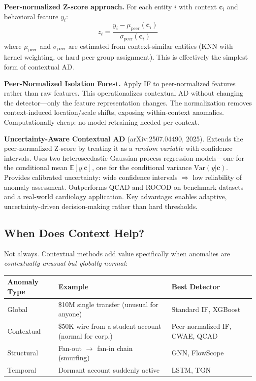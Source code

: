 \documentclass[11pt]{article}
\begin{document}
\textbf{Peer-normalized Z-score approach.} For each entity $i$ with context $\mathbf{c}_i$ and behavioral feature $y_i$:
\begin{equation*}
z_i = \frac{y_i - \mu_{\mathrm{peer}}(\mathbf{c}_i)}{\sigma_{\mathrm{peer}}(\mathbf{c}_i)}
\end{equation*}
where $\mu_{\mathrm{peer}}$ and $\sigma_{\mathrm{peer}}$ are estimated from context-similar entities (KNN with kernel weighting, or hard peer group assignment). This is effectively the simplest form of contextual AD.

\textbf{Peer-Normalized Isolation Forest.} Apply IF to peer-normalized features rather than raw features. This operationalizes contextual AD without changing the detector---only the feature representation changes. The normalization removes context-induced location/scale shifts, exposing within-context anomalies. Computationally cheap: no model retraining needed per context.

\textbf{Uncertainty-Aware Contextual AD} (arXiv:2507.04490, 2025). Extends the peer-normalized Z-score by treating it as a \textit{random variable} with confidence intervals. Uses two heteroscedastic Gaussian process regression models---one for the conditional mean $\mathbb{E}[y|\mathbf{c}]$, one for the conditional variance $\mathrm{Var}(y|\mathbf{c})$. Provides calibrated uncertainty: wide confidence intervals $\Rightarrow$ low reliability of anomaly assessment. Outperforms QCAD and ROCOD on benchmark datasets and a real-world cardiology application. Key advantage: enables adaptive, uncertainty-driven decision-making rather than hard thresholds.

\subsection{When Does Context Help?}

Not always. Contextual methods add value specifically when anomalies are \textit{contextually unusual but globally normal}:

\begin{center}
\small
\begin{tabular}{p{3cm}p{4.5cm}p{4cm}}
\toprule
\textbf{Anomaly Type} & \textbf{Example} & \textbf{Best Detector} \\
\midrule
Global & \$10M single transfer (unusual for anyone) & Standard IF, XGBoost \\
Contextual & \$50K wire from a student account (normal for corp.) & Peer-normalized IF, CWAE, QCAD \\
Structural & Fan-out $\to$ fan-in chain (smurfing) & GNN, FlowScope \\
Temporal & Dormant account suddenly active & LSTM, TGN \\
\bottomrule
\end{tabular}
\end{center}
\end{document}
